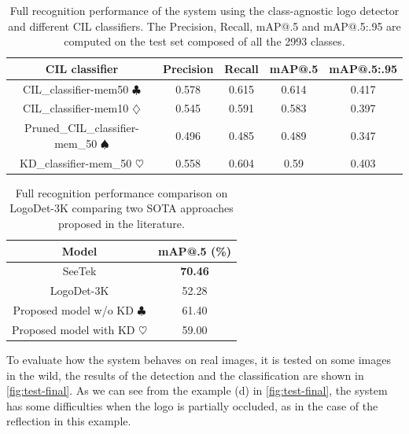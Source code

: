 \begin{table}[H]
    \centering
    \begin{tabular}{c|c|c|c|c}
        \hline
        \textbf{CIL classifier} &
        \textbf{Precision} &
        \textbf{Recall} &
        \textbf{mAP@.5} &
        \textbf{mAP@.5:.95} \\
        \hline
        \hline
CIL\_classifier-mem50 $\clubsuit$&0.578&0.615&0.614&0.417\\
CIL\_classifier-mem10 $\diamondsuit$&0.545&0.591&0.583&0.397\\
Pruned\_CIL\_classifier-mem\_50 $\spadesuit$&0.496&0.485&0.489&0.347\\
KD\_classifier-mem\_50 $\heartsuit$&0.558&0.604&0.59&0.403\\
\hline
\end{tabular}
\caption{Full recognition performance of the system using the class-agnostic logo detector and different CIL classifiers. The Precision, Recall, mAP@.5 and mAP@.5:.95 are computed on the test set composed of all the 2993 classes.}
    \label{table:exp-end2end}
\end{table}


\begin{table}[H]
    \centering
    \begin{tabular}{c|c}
        \hline
        \textbf{Model} &
        \textbf{mAP@.5 (\%)}\\
        \hline
        \hline
SeeTek \cite{li2022seetek}&\textbf{70.46}\\
LogoDet-3K \cite{wang2022logodet}&52.28\\
\hline
Proposed model w/o KD $\clubsuit$&61.40\\
Proposed model with KD $\heartsuit$&59.00\\
\hline
\end{tabular}
\caption{Full recognition performance comparison on LogoDet-3K comparing two SOTA approaches proposed in the literature.}
    \label{table:exp-end2end-sota}
\end{table}

To evaluate how the system behaves on real images, it is tested on some images in the wild, the results of the detection and the classification are shown in \autoref{fig:test-final}.
As we can see from the example (d) in \autoref{fig:test-final}, the system has some difficulties when the logo is partially occluded, as in the case of the reflection in this example.

